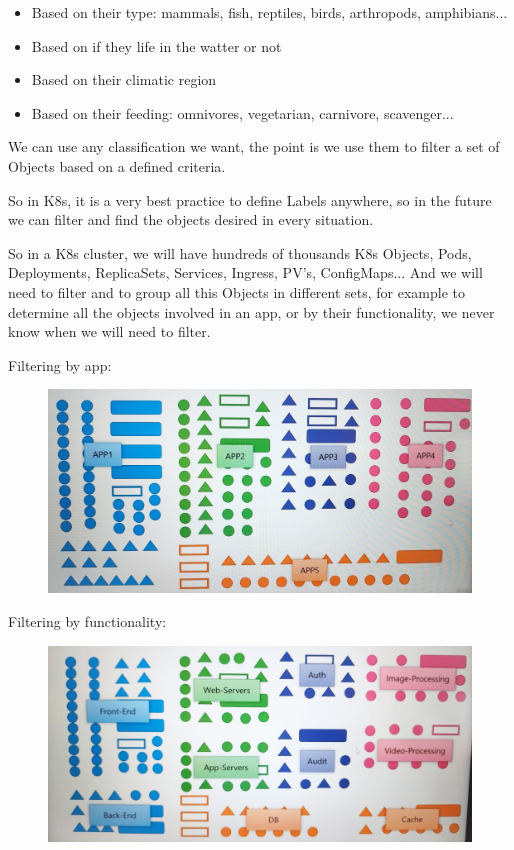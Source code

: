 \documentclass{article}
\begin{document}
\begin{itemize}
    \item Based on their type: mammals, fish, reptiles, birds, arthropods, amphibians...
    \item Based on if they life in the watter or not
    \item Based on their climatic region
    \item Based on their feeding: omnivores, vegetarian, carnivore, scavenger...
\end{itemize}

We can use any classification we want, the point is we use them to filter a set of Objects based on a defined criteria.

So in K8s, it is a very best practice to define Labels anywhere, so in the future we can filter and find the objects desired in every situation.

So in a K8s cluster, we will have hundreds of thousands K8s Objects, Pods, Deployments, ReplicaSets, Services, Ingress, PV's, ConfigMaps... And we will need to filter and to group all this Objects in different sets, for example to determine all the objects involved in an app, or by their functionality, we never know when we will need to filter.

Filtering by app:

\begin{figure}[H]
    \centering
    \includegraphics[width=\textwidth]{pictures/sch4.jpg}
\end{figure}

Filtering by functionality:

\begin{figure}[H]
    \centering
    \includegraphics[width=\textwidth]{pictures/sch3.png}
\end{figure}
\end{document}
